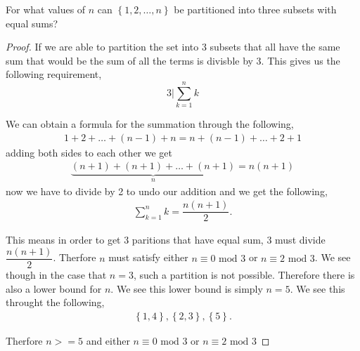 \documentclass[11pt]{article}
\newenvironment{problem}[2][Problem\!]{\begin{trivlist}
\item[\hskip \labelsep {\bfseries #1}\hskip \labelsep {\bfseries #2}]}{\end{trivlist}}
\newcommand{\set}[1]{\left\{#1\right\}} %
\begin{document}
\newpage
\begin{tcolorbox}
  \begin{problem} {IC | 11/10 | 139.}
    For what values of $n$ can $\set{1,2,\dots,n}$ be partitioned into three subsets with equal sums? 
  \end{problem}
\end{tcolorbox}
\begin{proof}
    If we are able to partition the set into 3 subsets that all have the same sum that would be the sum of all the terms is divisble by 3. This gives us the following requirement, \[3|\sum_{k =1}^{n}k\]

    We can obtain a formula for the summation through the following,
    \begin{align*}
        1 + 2 + \dots + (n-1) + n = n + (n-1) + \dots + 2 + 1
    \end{align*}
    adding both sides to each other we get 
    \begin{align*}
        \underbrace{(n+1) + (n+1) + \dots + (n+1)}_{n} = n(n+1)
    \end{align*}
    now we have to divide by 2 to undo our addition and we get the following,
    \begin{align*}
        \sum_{k = 1}^{n}k = \dfrac{n(n+1)}{2}.
    \end{align*}

    This means in order to get 3 paritions that have equal sum, 3 must divide $\dfrac{n(n+1)}{2}$. Therfore $n$ must satisfy either $n \equiv 0 \text{ mod }3$ or $n \equiv 2 \text{ mod }3$. We see though in the case that $n = 3$, such a partition is not possible. Therefore there is also a lower bound for $n$. We see this lower bound is simply $n = 5$. We see this throught the following, 
    \begin{align}
        \set{1,4}, \set{2,3}, \set{5}.
    \end{align}

    Therfore $n >=5$ and either $n \equiv 0 \text{ mod }3$ or $n \equiv 2 \text{ mod }3$
\end{proof}
\end{document}

